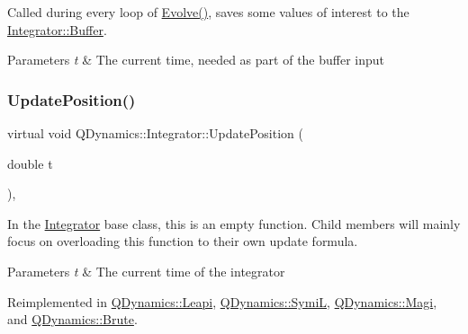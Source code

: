 Called during every loop of \hyperlink{classQDynamics_1_1Integrator_a4b921b312775194b77c2c85f93add84e}{Evolve()}, saves some values of interest to the \hyperlink{classQDynamics_1_1Integrator_af8889c2bbe10237a8dd8c46b25b15d29}{Integrator\+::\+Buffer}. 


\begin{DoxyParams}{Parameters}
{\em t} & The current time, needed as part of the buffer input \\
\hline
\end{DoxyParams}
\mbox{\label{classQDynamics_1_1Integrator_a4effa27d56f3205e53653b1fdc5cd08e}} 
\subsubsection{\texorpdfstring{Update\+Position()}{UpdatePosition()}}
{\footnotesize\ttfamily virtual void Q\+Dynamics\+::\+Integrator\+::\+Update\+Position (\begin{DoxyParamCaption}\item[{double}]{t }\end{DoxyParamCaption})\hspace{0.3cm}{\ttfamily [inline]}, {\ttfamily [virtual]}}



In the \hyperlink{classQDynamics_1_1Integrator}{Integrator} base class, this is an empty function. Child members will mainly focus on overloading this function to their own update formula. 


\begin{DoxyParams}{Parameters}
{\em t} & The current time of the integrator \\
\hline
\end{DoxyParams}


Reimplemented in \hyperlink{classQDynamics_1_1Leapi_ada2b4935513fa7e0cb4f78ade9f2fd0e}{Q\+Dynamics\+::\+Leapi}, \hyperlink{classQDynamics_1_1SymiL_a28d23793abeb8f40c9d9ec069d67debb}{Q\+Dynamics\+::\+SymiL}, \hyperlink{classQDynamics_1_1Magi_a500467f899244edfae15f34c84c7684c}{Q\+Dynamics\+::\+Magi}, and \hyperlink{classQDynamics_1_1Brute_ac5d4bbe0e34a9f6836f71f40ae8a9eb4}{Q\+Dynamics\+::\+Brute}.

\mbox{\label{classQDynamics_1_1Integrator_a88dc286b39899bdec60c040427d663cc}} 
